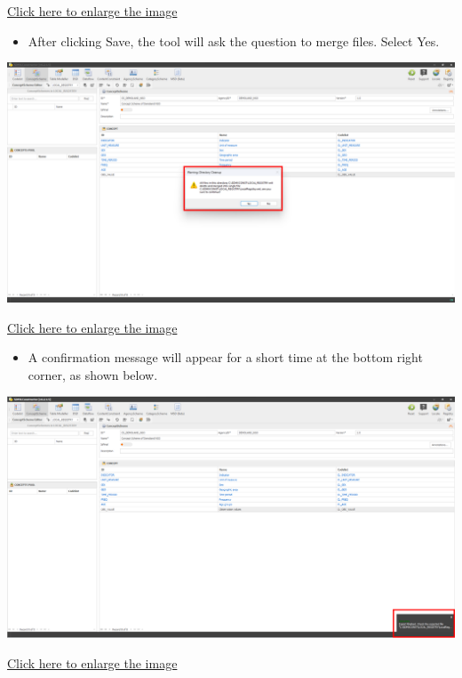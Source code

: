 \documentclass[
]{book}
\providecommand{\tightlist}{%
  \setlength{\itemsep}{0pt}\setlength{\parskip}{0pt}}
\begin{document}
\href{images/image123.png}{Click here to enlarge the image}

\begin{itemize}
\tightlist
\item
  After clicking Save, the tool will ask the question to merge files. Select Yes.
\end{itemize}

\begin{center}\includegraphics[width=1\linewidth]{./images/image125} \end{center}

\href{images/image125.png}{Click here to enlarge the image}

\begin{itemize}
\tightlist
\item
  A confirmation message will appear for a short time at the bottom right corner, as shown below.
\end{itemize}

\begin{center}\includegraphics[width=1\linewidth]{./images/image127} \end{center}

\href{images/image127.png}{Click here to enlarge the image}
\end{document}
